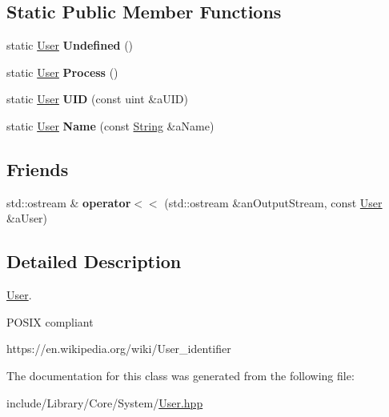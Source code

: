 \subsection*{Static Public Member Functions}
\begin{DoxyCompactItemize}
\item 
\mbox{\label{classlibrary_1_1core_1_1system_1_1_user_a1195bb2bc30837f9287ea5ed0bfca71b}} 
static \hyperlink{classlibrary_1_1core_1_1system_1_1_user}{User} {\bfseries Undefined} ()
\item 
\mbox{\label{classlibrary_1_1core_1_1system_1_1_user_a15de974c46bff0ff680403edc4ce129d}} 
static \hyperlink{classlibrary_1_1core_1_1system_1_1_user}{User} {\bfseries Process} ()
\item 
\mbox{\label{classlibrary_1_1core_1_1system_1_1_user_a8843d795dde3c3f0b2054b83a7124830}} 
static \hyperlink{classlibrary_1_1core_1_1system_1_1_user}{User} {\bfseries U\+ID} (const uint \&a\+U\+ID)
\item 
\mbox{\label{classlibrary_1_1core_1_1system_1_1_user_a2088b7516e89adf5b6fc9f13e58acc61}} 
static \hyperlink{classlibrary_1_1core_1_1system_1_1_user}{User} {\bfseries Name} (const \hyperlink{classlibrary_1_1core_1_1types_1_1_string}{String} \&a\+Name)
\end{DoxyCompactItemize}
\subsection*{Friends}
\begin{DoxyCompactItemize}
\item 
\mbox{\label{classlibrary_1_1core_1_1system_1_1_user_ac434498b36c6e29a86acbb50589e91a3}} 
std\+::ostream \& {\bfseries operator$<$$<$} (std\+::ostream \&an\+Output\+Stream, const \hyperlink{classlibrary_1_1core_1_1system_1_1_user}{User} \&a\+User)
\end{DoxyCompactItemize}


\subsection{Detailed Description}
\hyperlink{classlibrary_1_1core_1_1system_1_1_user}{User}. 

P\+O\+S\+IX compliant

https\+://en.wikipedia.\+org/wiki/\+User\+\_\+identifier 

The documentation for this class was generated from the following file\+:\begin{DoxyCompactItemize}
\item 
include/\+Library/\+Core/\+System/\hyperlink{_user_8hpp}{User.\+hpp}\end{DoxyCompactItemize}
